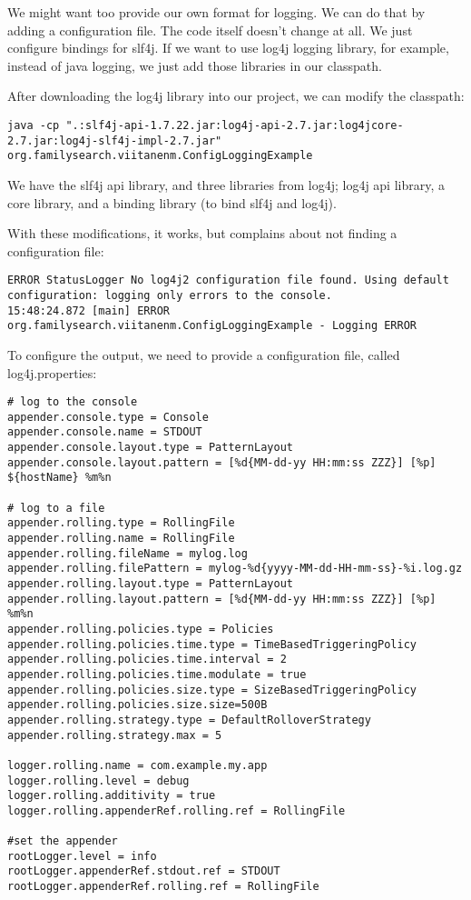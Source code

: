 We might want too provide our own format for logging. We can do that by adding a configuration file. The code itself doesn't change at all. We just configure bindings for slf4j. If we want to use log4j logging library, for example, instead of java logging, we just add those libraries in our classpath.

After downloading the log4j library into our project, we can modify the classpath:
\begin{lstlisting}
java -cp ".:slf4j-api-1.7.22.jar:log4j-api-2.7.jar:log4jcore-2.7.jar:log4j-slf4j-impl-2.7.jar"  org.familysearch.viitanenm.ConfigLoggingExample
\end{lstlisting}

We have the slf4j api library, and three libraries from log4j; log4j api library, a core library, and a binding library (to bind slf4j and log4j). 

With these modifications, it works, but complains about not finding a configuration file:
\begin{lstlisting}
ERROR StatusLogger No log4j2 configuration file found. Using default configuration: logging only errors to the console.
15:48:24.872 [main] ERROR org.familysearch.viitanenm.ConfigLoggingExample - Logging ERROR
\end{lstlisting}

To configure the output, we need to provide a configuration file, called log4j.properties:
\begin{lstlisting}
# log to the console
appender.console.type = Console
appender.console.name = STDOUT
appender.console.layout.type = PatternLayout
appender.console.layout.pattern = [%d{MM-dd-yy HH:mm:ss ZZZ}] [%p] ${hostName} %m%n

# log to a file
appender.rolling.type = RollingFile
appender.rolling.name = RollingFile
appender.rolling.fileName = mylog.log
appender.rolling.filePattern = mylog-%d{yyyy-MM-dd-HH-mm-ss}-%i.log.gz
appender.rolling.layout.type = PatternLayout
appender.rolling.layout.pattern = [%d{MM-dd-yy HH:mm:ss ZZZ}] [%p] %m%n
appender.rolling.policies.type = Policies
appender.rolling.policies.time.type = TimeBasedTriggeringPolicy
appender.rolling.policies.time.interval = 2
appender.rolling.policies.time.modulate = true
appender.rolling.policies.size.type = SizeBasedTriggeringPolicy
appender.rolling.policies.size.size=500B
appender.rolling.strategy.type = DefaultRolloverStrategy
appender.rolling.strategy.max = 5
 
logger.rolling.name = com.example.my.app
logger.rolling.level = debug
logger.rolling.additivity = true
logger.rolling.appenderRef.rolling.ref = RollingFile

#set the appender
rootLogger.level = info
rootLogger.appenderRef.stdout.ref = STDOUT
rootLogger.appenderRef.rolling.ref = RollingFile
\end{lstlisting}


